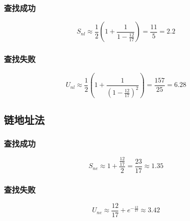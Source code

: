 \documentclass[UTF8]{ctexart}
\begin{document}
    \subsubsection{查找成功}
    $$S_{nl}\approx \frac{1}{2} \left( 1+\frac{1}{1-\frac{12}{17}}\right)=\frac{11}{5}=2.2$$
    \subsubsection{查找失败}
    $$U_{nl}\approx \frac{1}{2} \left( 1+\frac{1}{\left(1-\frac{12}{17}\right)^2}\right)=\frac{157}{25}=6.28$$
    \subsection{链地址法}
    \subsubsection{查找成功}
    $$S_{ne}\approx 1+\frac{\frac{12}{17}}{2}=\frac{23}{17}\approx 1.35$$
    \subsubsection{查找失败}
    $$U_{ne}\approx \frac{12}{17}+e^{-\frac{12}{17}}\approx 3.42$$
\end{document}
